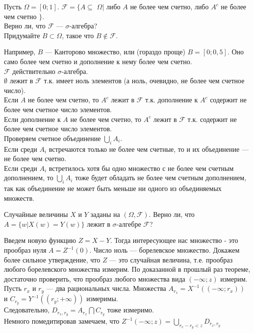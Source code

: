 \begin{solution}
\begin{problem}
Пусть $\Omega=[0;1]$. $\mathcal{F}=\{A\subseteq$ $\Omega|$ либо $A$ не
более чем счетно, либо $A^{c}$ не более чем счетно $\}$. \\
Верно ли, что $\mathcal{F}$ --- $\sigma$-алгебра? \\
Придумайте $B\subset\Omega$, такое что $B \notin\mathcal{F}$. 
\end{problem} 
\begin{solution} 
Например, $B$ --- Канторово множество, или (гораздо проще)
$B=[0;0,5]$. Оно само более чем счетно и дополнение к нему более
чем счетно. \\
$\mathcal{F}$ действительно $\sigma$-алгебра. \\
$\emptyset$ лежит в $\mathcal{F}$ т.к. имеет ноль элементов (а ноль,
очевидно, не более чем счетное число). \\
Если $A$ не более чем счетно, то $A^{c}$ лежит в $\mathcal{F}$
т.к. дополнение к $A^{c}$ содержит не более чем счетное
число элементов. \\
Если дополнение к $A$ не более чем счетно, то $A^{c}$ лежит
в $\mathcal{F}$ т.к. содержит не более чем счетное число элементов. \\
Проверяем счетное объединение $\bigcup_{i} A_{i}$. \\
Если среди $A_{i}$ встречаются только не более чем счетные, то и
их объединение --- не более чем счетно. \\
Если среди $A_{i}$ встретилось хотя бы одно множество с не более
чем счетным дополнением, то $\bigcup_{i} A_{i}$ тоже будет
обладать не более чем счетным дополнением, так как объединение не
может быть меньше ни одного из объединяемых множеств. 
\end{solution}

\begin{problem}
Случайные величины $X$ и $Y$ заданы на $(\Omega,\mathcal{F})$. Верно ли, что $A=\{w|X(w)=Y(w)\}$ лежит в $\sigma$-алгебре $\mathcal{F}$?
\end{problem} 
\begin{solution} 

Введем новую функцию $Z=X-Y$. Тогда интересующее нас множество -
это прообраз нуля $A=Z^{-1}(0)$. Число ноль --- борелевское
множество. Докажем более сильное утверждение, что $Z$ --- это
случайная величина, т.е. прообраз любого борелевского множества
измерим. 
По доказанной в прошлый раз теореме, достаточно проверить, что
прообраз любого множества вида $(-\infty;z)$ измерим. \\
Пусть $r_{x}$ и $r_{y}$ --- два рациональных числа. Множества
$A_{r_{x}}=X^{-1}((-\infty;r_{x}))$ и
$C_{r_{y}}=Y^{-1}((r_{y};+\infty))$ измеримы. \\
Следовательно, $D_{r_{x},r_{y}}=A_{r_{x}} \bigcap C_{r_{y}}$ тоже
измеримо. \\
Немного помедитировав замечаем, что $Z^{-1}(-\infty;z)=\bigcup_{r_{x}-r_{y}<z} D_{r_{x},r_{y}}$ 
\end{solution}


\end{solution}
